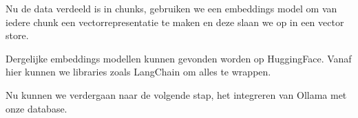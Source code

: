 Nu de data verdeeld is in chunks, gebruiken we een embeddings model om van iedere chunk een vectorrepresentatie te maken en deze slaan we op in een vector store. 

Dergelijke embeddings modellen kunnen gevonden worden op HuggingFace. Vanaf hier kunnen we libraries zoals LangChain om alles te wrappen. 

Nu kunnen we verdergaan naar de volgende stap, het integreren van Ollama met onze database.

